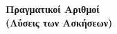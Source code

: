 




\setlength{\columnseprule}{1pt}
\setlength{\columnsep}{20pt}
\def\columnseprulecolor{\color{Col1}}

\renewcommand{\qedsymbol}{}



\pagestyle{vangelis}

\begin{center}
  \large\bfseries\textcolor{Col2}{Πραγματικοί Αριθμοί} \\
  \large\bfseries\textcolor{Col2}{(Λύσεις των Ασκήσεων)}
\end{center}

\vspace{\baselineskip}


\begin{multicols}{2}


\end{multicols}

